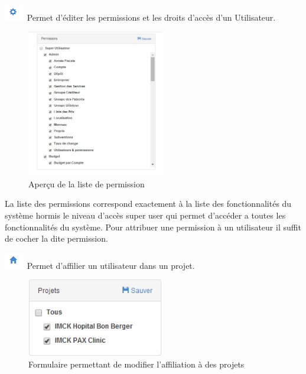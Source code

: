 \documentclass[12pt,a4paper]{report}
\begin{document}
\newpage
 \includegraphics[scale=1]{pic/PermissionUser.png} Permet d'éditer les permissions et les droits d'accès d'un Utilisateur.
 \begin{figure}[h]
\begin{center}
\includegraphics[width=6cm]{pic/ListeDePermission.png}
\end{center}
\caption{Aperçu de la liste de permission}
\label{Aperçu de la liste de permission}
\end{figure}

La liste des permissions correspond exactement à la liste des fonctionnalités du système hormis le niveau d'accès super user qui permet d'accéder a toutes les fonctionnalités du système. Pour attribuer une permission à un utilisateur il suffit de cocher la dite permission.

\newpage
\includegraphics[scale=1]{pic/Projet.png} Permet d'affilier un utilisateur dans un projet.
\begin{figure}[h]
\begin{center}
\includegraphics[width=6cm]{pic/ListeProjet.png}
\end{center}
\caption{Formulaire permettant de modifier l'affiliation à des projets}
\label{Formulaire permettant de modifier l'affiliation à des projets}
\end{figure}
\end{document}
